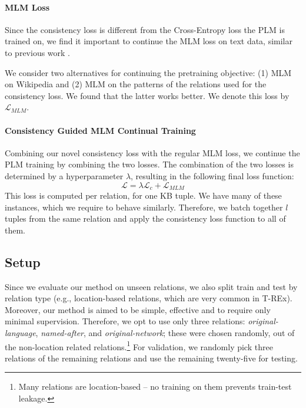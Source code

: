 \paragraph{MLM Loss}
Since the consistency loss is different from the
Cross-Entropy loss the PLM is trained on, we find it
important to continue the MLM loss on text data, similar to previous work \cite{geva2020injecting}.

We consider two alternatives for continuing the pretraining objective: (1) MLM on Wikipedia and (2) MLM on the patterns of the relations used for the consistency loss. We found that the latter works better. We denote this loss by $\mathcal{L}_{MLM}$.


\paragraph{Consistency Guided MLM Continual Training}

Combining our novel consistency loss with
the regular MLM loss, we continue the PLM training by
combining the two losses. The combination of the two losses
is determined by a hyperparameter $\lambda$, resulting in
the following final loss function:
\[
\mathcal{L} = \lambda \mathcal{L}_c + \mathcal{L}_{MLM}
\]
This loss is computed per relation, for one KB tuple. We have many of these instances, which we require to behave similarly. Therefore, we batch together $l$ tuples from the same relation and apply the consistency loss function to all of them.




\subsection{Setup}


Since we evaluate our method on unseen relations, we also
split  train and test by  relation type (e.g., location-based relations, which are very common
in T-REx).  Moreover, our method is aimed to be simple,
effective and to require only minimal supervision. Therefore,
we opt to use only three relations:
\textit{original-language}, \textit{named-after}, and
\textit{original-network}; these were chosen randomly, out of
the non-location related relations.\footnote{Many
  relations are location-based -- no training on them prevents
 train-test leakage.} 
For validation, we randomly pick three
relations of the remaining relations and use the remaining
twenty-five for testing.

